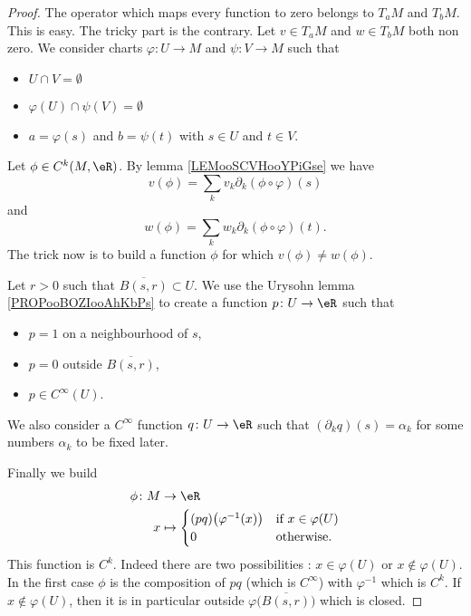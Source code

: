 \begin{proof}
    The operator which maps every function to zero belongs to \( T_aM\) and \( T_bM\). This is easy. The tricky part is the contrary. Let \( v\in T_aM\) and \( w\in T_bM\) both non zero. We consider charts \( \varphi\colon U\to M\) and \( \psi\colon V\to M\) such that
    \begin{itemize}
        \item \( U\cap V=\emptyset\)
        \item \( \varphi(U)\cap \psi(V)=\emptyset\)
        \item \( a=\varphi(s)\) and \( b=\psi(t)\) with \( s\in U\) and \( t\in V\).
    \end{itemize}
    Let \( \phi\in C^k(M,\eR)\). By lemma \ref{LEMooSCVHooYPiGse} we have
    \begin{equation}        \label{EQooTQKZooIeQNaU}
        v(\phi)=\sum_kv_k\partial_k(\phi\circ \varphi)(s)
    \end{equation}
    and
    \begin{equation}
        w(\phi)=\sum_kw_k\partial_k(\phi\circ \varphi)(t).
    \end{equation}
    The trick now is to build a function \( \phi\) for which \( v(\phi)\neq w(\phi)\).

    Let \( r>0\) such that \( \overline{ B(s,r) }\subset U\). We use the Urysohn lemma \ref{PROPooBOZIooAhKbPs} to create a function \( p\colon U\to \eR\) such that
    \begin{itemize}
        \item \( p=1\) on a neighbourhood of \( s\),
        \item \( p=0\) outside \( \overline{ B(s,r) }\),
        \item \( p\in  C^{\infty}(U)\).
    \end{itemize}
    We also consider a \(  C^{\infty}\) function \( q\colon U\to \eR\) such that \( (\partial_kq)(s)=\alpha_k\) for some numbers \( \alpha_k\) to be fixed later.

    Finally we build
    \begin{equation}
        \begin{aligned}
            \phi\colon M&\to \eR \\
            x&\mapsto \begin{cases}
                (pq)\big( \varphi^{-1}(x) \big)    &   \text{if }  x\in \varphi(U)\\
                0    &    \text{otherwise. }
            \end{cases}
        \end{aligned}
    \end{equation}
    This function is \( C^k\). Indeed there are two possibilities : \( x\in \varphi(U)\) or \( x\notin\varphi(U)\). In the first case \( \phi\) is the composition of \( pq\) (which is \(  C^{\infty}\)) with \( \varphi^{-1}\) which is \( C^k\). If \( x\notin\varphi(U)\), then it is in particular outside \( \varphi\big( \overline{ B(s,r) } \big)\) which is closed.


\end{proof}
